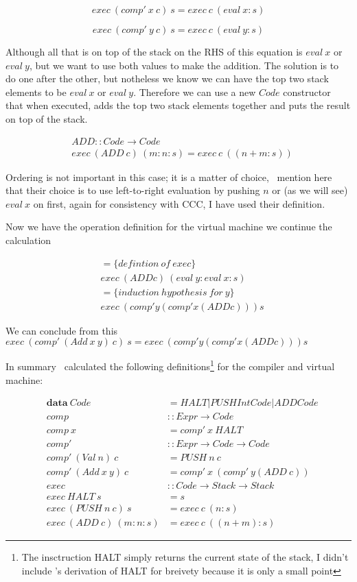 \documentclass {article}
\begin{document}
\[exec \ (comp' \ x \ c) \ s = exec \ c \ (eval \ x:s) \]

\[exec \ (comp' \ y \ c) \ s = exec \ c \ (eval \ y:s) \]

Although all that is on top of the stack on the
RHS of this equation is $eval \ x$ or $eval \ y$,
but we want to use both values to make the addition.
The solution is to do one after the other,
but notheless we know we can have the top two 
stack elements to be $eval \ x$ or $eval \ y$.
Therefore we can use a new $Code$ constructor
that when executed, adds the top two stack elements
together and puts the result on top of the stack.

\begin{align*}
	&ADD :: Code \rightarrow Code \\
	&exec \ (ADD \ c) \ (m:n:s) = exec \ c \ ((n+m:s))
\end{align*}

Ordering is not important in this case; it is a matter of choice,
\BH\ mention here that their choice is to use
left-to-right evaluation by pushing $n$ 
or (as we will see)  $eval \ x$ on first,
again for consistency with CCC, 
I have used their definition.

Now we have the operation definition for the 
virtual machine we continue the calculation 

\begin{align*}
	&= \{ defintion \ of \ exec \} \\
	&exec \ (ADD c) \ (eval \ y : eval \ x : s) \\
	&= \{ induction \ hypothesis \ for \ y \} \\
	&exec \ (comp' y (comp' x (ADD c))) s
\end{align*}

We can conclude from this 
\( exec \ (comp' \ (Add \ x \ y) \ c) \ s = exec \ (comp' y (comp' x (ADD c))) s\)

In summary \BH\ calculated the following definitions\footnote{
The insctruction HALT simply returns the current state of the stack,
I didn't include \BH's derivation of HALT for breivety because
it is only a small point}
for the compiler and virtual machine:

\begin{eqnarray*}
	&\textbf{data} \ Code &= HALT | PUSH Int Code | ADD Code \\
	&comp &:: Expr \rightarrow Code \\
	&comp \ x &= comp' \ x \ HALT \\
	&comp' &:: Expr \rightarrow Code \rightarrow Code \\
	&comp' \ (Val \ n) \ c &= PUSH \ n \ c \\
	&comp' \ (Add \ x \ y) \ c &= comp' \ x \ (comp' \ y (ADD \ c)) \\
	&exec &:: Code  \rightarrow Stack \rightarrow Stack \\
	&exec \ HALT \ s &= s \\
	&exec \ (PUSH \ n \ c) \ s &= exec \ c \ (n:s) \\
	&exec \ (ADD \ c) \ (m:n:s) &= exec \ c \ ((n + m):s)
\end{eqnarray*}
\end{document}
